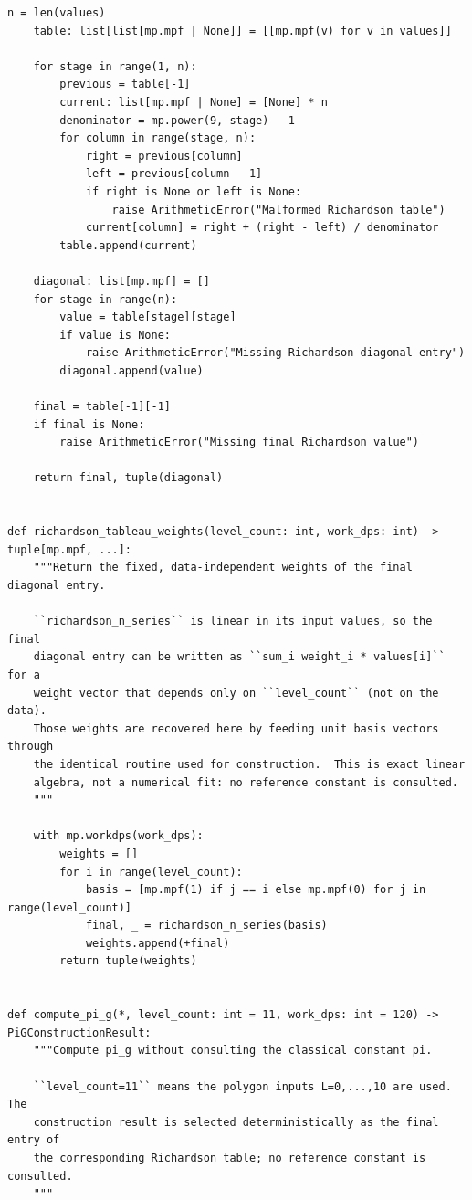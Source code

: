 \documentclass[11pt]{article}
\begin{document}
\begin{lstlisting}[style=pythonstyle,caption={\texttt{pi\_g\_construction.py}}]
    n = len(values)
    table: list[list[mp.mpf | None]] = [[mp.mpf(v) for v in values]]

    for stage in range(1, n):
        previous = table[-1]
        current: list[mp.mpf | None] = [None] * n
        denominator = mp.power(9, stage) - 1
        for column in range(stage, n):
            right = previous[column]
            left = previous[column - 1]
            if right is None or left is None:
                raise ArithmeticError("Malformed Richardson table")
            current[column] = right + (right - left) / denominator
        table.append(current)

    diagonal: list[mp.mpf] = []
    for stage in range(n):
        value = table[stage][stage]
        if value is None:
            raise ArithmeticError("Missing Richardson diagonal entry")
        diagonal.append(value)

    final = table[-1][-1]
    if final is None:
        raise ArithmeticError("Missing final Richardson value")

    return final, tuple(diagonal)


def richardson_tableau_weights(level_count: int, work_dps: int) -> tuple[mp.mpf, ...]:
    """Return the fixed, data-independent weights of the final diagonal entry.

    ``richardson_n_series`` is linear in its input values, so the final
    diagonal entry can be written as ``sum_i weight_i * values[i]`` for a
    weight vector that depends only on ``level_count`` (not on the data).
    Those weights are recovered here by feeding unit basis vectors through
    the identical routine used for construction.  This is exact linear
    algebra, not a numerical fit: no reference constant is consulted.
    """

    with mp.workdps(work_dps):
        weights = []
        for i in range(level_count):
            basis = [mp.mpf(1) if j == i else mp.mpf(0) for j in range(level_count)]
            final, _ = richardson_n_series(basis)
            weights.append(+final)
        return tuple(weights)


def compute_pi_g(*, level_count: int = 11, work_dps: int = 120) -> PiGConstructionResult:
    """Compute pi_g without consulting the classical constant pi.

    ``level_count=11`` means the polygon inputs L=0,...,10 are used.  The
    construction result is selected deterministically as the final entry of
    the corresponding Richardson table; no reference constant is consulted.
    """


\end{lstlisting}
\end{document}
